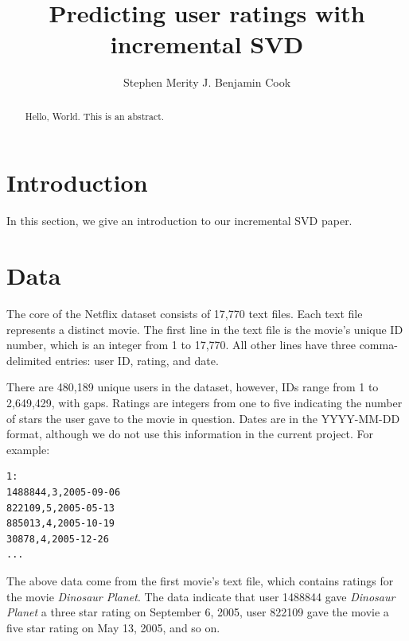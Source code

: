 \documentclass{article} %
\title{Predicting user ratings with incremental SVD}
\author{
Stephen Merity
\And
J. Benjamin Cook
}
\begin{document}
\maketitle

\begin{abstract}
Hello, World. This is an abstract.
\end{abstract}

\section{Introduction}

In this section, we give an introduction to our incremental SVD paper.

\section{Data}

The core of the Netflix dataset consists of 17,770 text files.
Each text file represents a distinct movie.
The first line in the text file is the movie's unique ID number, which is
an integer from 1 to 17,770.
All other lines have three comma-delimited entries: user ID, rating, and date.

There are 480,189 unique users in the dataset, however, IDs range from 1 to 2,649,429, with gaps. 
Ratings are integers from one to five indicating the number of stars 
the user gave to the movie in question.
Dates are in the YYYY-MM-DD format, although we do not use this information in the current project. 
For example:

\begin{verbatim}
1:
1488844,3,2005-09-06
822109,5,2005-05-13
885013,4,2005-10-19
30878,4,2005-12-26
...
\end{verbatim}

The above data come from the first movie's text file, which contains ratings for the movie \emph{Dinosaur Planet}. The data indicate that user 1488844 gave \emph{Dinosaur Planet} a three star rating on September 6, 2005, user 822109 gave the movie a five star rating on May 13, 2005, and so on.
\end{document}
